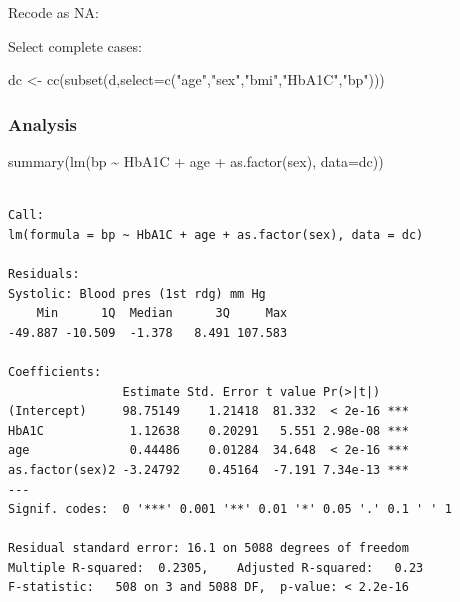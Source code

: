 \documentclass[
  letterpaper,
  DIV=11,
  numbers=noendperiod]{scrartcl}
\newenvironment{Shaded}{\begin{snugshade}}{\end{snugshade}}
\newcommand{\AttributeTok}[1]{\textcolor[rgb]{0.40,0.45,0.13}{#1}}
\newcommand{\ConstantTok}[1]{\textcolor[rgb]{0.56,0.35,0.01}{#1}}
\newcommand{\DecValTok}[1]{\textcolor[rgb]{0.68,0.00,0.00}{#1}}
\newcommand{\FunctionTok}[1]{\textcolor[rgb]{0.28,0.35,0.67}{#1}}
\newcommand{\NormalTok}[1]{\textcolor[rgb]{0.00,0.23,0.31}{#1}}
\newcommand{\OtherTok}[1]{\textcolor[rgb]{0.00,0.23,0.31}{#1}}
\newcommand{\SpecialCharTok}[1]{\textcolor[rgb]{0.37,0.37,0.37}{#1}}
\newcommand{\StringTok}[1]{\textcolor[rgb]{0.13,0.47,0.30}{#1}}
\begin{document}
Recode as NA:

\begin{Shaded}
\end{Shaded}

Select complete cases:

\begin{Shaded}
\begin{Highlighting}[]
\NormalTok{dc }\OtherTok{\textless{}{-}} \FunctionTok{cc}\NormalTok{(}\FunctionTok{subset}\NormalTok{(d,}\AttributeTok{select=}\FunctionTok{c}\NormalTok{(}\StringTok{"age"}\NormalTok{,}\StringTok{"sex"}\NormalTok{,}\StringTok{"bmi"}\NormalTok{,}\StringTok{"HbA1C"}\NormalTok{,}\StringTok{"bp"}\NormalTok{)))}
\end{Highlighting}
\end{Shaded}

\hypertarget{analysis}{%
\subsubsection{Analysis}\label{analysis}}

\begin{Shaded}
\begin{Highlighting}[]
\FunctionTok{summary}\NormalTok{(}\FunctionTok{lm}\NormalTok{(bp }\SpecialCharTok{\textasciitilde{}}\NormalTok{ HbA1C }\SpecialCharTok{+}\NormalTok{ age }\SpecialCharTok{+} \FunctionTok{as.factor}\NormalTok{(sex), }\AttributeTok{data=}\NormalTok{dc))}
\end{Highlighting}
\end{Shaded}

\begin{verbatim}

Call:
lm(formula = bp ~ HbA1C + age + as.factor(sex), data = dc)

Residuals:
Systolic: Blood pres (1st rdg) mm Hg 
    Min      1Q  Median      3Q     Max 
-49.887 -10.509  -1.378   8.491 107.583 

Coefficients:
                Estimate Std. Error t value Pr(>|t|)    
(Intercept)     98.75149    1.21418  81.332  < 2e-16 ***
HbA1C            1.12638    0.20291   5.551 2.98e-08 ***
age              0.44486    0.01284  34.648  < 2e-16 ***
as.factor(sex)2 -3.24792    0.45164  -7.191 7.34e-13 ***
---
Signif. codes:  0 '***' 0.001 '**' 0.01 '*' 0.05 '.' 0.1 ' ' 1

Residual standard error: 16.1 on 5088 degrees of freedom
Multiple R-squared:  0.2305,    Adjusted R-squared:   0.23 
F-statistic:   508 on 3 and 5088 DF,  p-value: < 2.2e-16
\end{verbatim}
\end{document}
